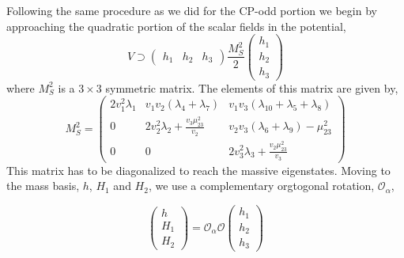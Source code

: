 Following the same procedure as we did for the CP-odd portion we begin by approaching the quadratic portion of the scalar fields in the potential,
%
\begin{equation}
V \supset \left( \begin{array}{ccc} 
h_1 & h_2 & h_3 
\end{array} \right) 
\frac{M_S^2}{2} \left( \begin{array}{c}
h_1 \\ 
h_2 \\
h_3
\end{array} \right) 
\end{equation}
where $M_S^2$ is a $3\times3$ symmetric matrix. The elements of this matrix are given by,
\begin{equation}
M_S^2 = \begin{pmatrix}
2 v_1^2 \lambda_1 & v_1 v_2 \left( \lambda_4 + \lambda_7 \right) & v_1 v_3 \left( \lambda_{10} + \lambda_5 + \lambda_8 \right) \\ 
0 & 2 v_2^2 \lambda_2 + \frac{v_3 \mu_{23}^2}{v_2} & v_2 v_3 \left( \lambda_6 + \lambda_9 \right) - \mu_{23}^2 \\ 
0 & 0 & 2 v_3^2 \lambda_3 + \frac{v_2 \mu_{23}^2}{v_3}  
\end{pmatrix}
\end{equation}
%
This matrix has to be diagonalized to reach the massive eigenstates. Moving to the mass basis, $h$, $H_1$ and $H_2$, we use a complementary orgtogonal rotation, $\mathcal{O}_\alpha$,
\begin{comment}
\begin{equation}
\begin{split}
\left(M_S^2\right)_{11} & \\
\left(M_S^2\right)_{12} & \\
\left(M_S^2\right)_{13} & \\
\left(M_S^2\right)_{22} & \\
\left(M_S^2\right)_{23} & \\
\left(M_S^2\right)_{33} & 
\end{split}
\end{equation}
\end{comment} 
\begin{equation}
\left( 
\begin{array}{c}
h   \\
H_1 \\
H_2 
\end{array} 
\right) = \mathcal{O}_\alpha \mathcal{O} \left( 
\begin{array}{c}
h_1 \\
h_2 \\
h_3 
\end{array} 
\right)
\end{equation} 
